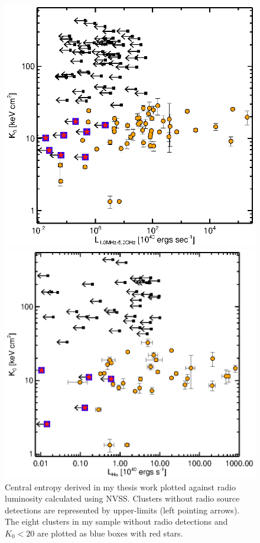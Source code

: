 \documentclass[11pt]{article}
\begin{document}
\begin{figure}[t]
\begin{minipage}[t]{0.5\linewidth}
        \includegraphics*[width=\textwidth, trim=28mm 8mm 30mm 10mm, clip]{k0rad}
        \caption{\small Central entropy derived in my thesis work
        plotted against radio luminosity calculated using
        NVSS. Clusters without radio source detections are represented
	by upper-limits (left pointing arrows). The eight clusters in my
	sample without radio detections and $K_0 < 20$ are plotted as blue
	boxes with red stars.}
        \label{fig:radk0}
    \end{minipage}
    \hspace{0.1in}
    \begin{minipage}[t]{0.5\linewidth}
        \centering
        \includegraphics*[width=\textwidth, trim=28mm 8mm 30mm 10mm, clip]{ha_k0}

\end{minipage}
\end{figure}
\end{document}
